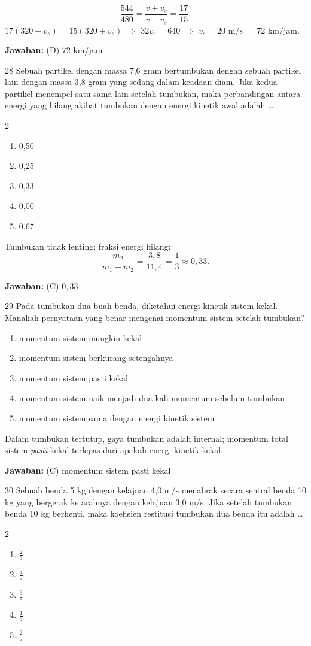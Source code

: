 \documentclass[11pt]{article}
\newenvironment{pil}{%
  \begin{enumerate}[label=(\Alph*),leftmargin=*,itemsep=1pt,topsep=3pt]}%
  {\end{enumerate}}
\newenvironment{pilB}{%
  \par\smallskip\begin{multicols}{2}
  \begin{enumerate}[label=(\Alph*),leftmargin=*,itemsep=1pt,topsep=3pt]}%
  {\end{enumerate}\end{multicols}}
\newcommand{\jawaban}[1]{%
  \noindent\colorbox{gold!30}{\parbox{\dimexpr\linewidth-2\fboxsep\relax}{%
    \textbf{Jawaban:} #1}}\par\smallskip}
\begin{document}
\begin{pembox}
\[\frac{544}{480}=\frac{v+v_s}{v-v_s}=\frac{17}{15}.\]
$17(320-v_s)=15(320+v_s)$ $\Rightarrow$ $32v_s=640$ $\Rightarrow$ $v_s=20$ m/s $=72$ km/jam.
\jawaban{(D) $72$ km/jam}
\end{pembox}

\begin{soal}{28}
Sebuah partikel dengan massa 7,6 gram bertumbukan dengan sebuah partikel
lain dengan massa 3,8 gram yang sedang dalam keadaan diam. Jika kedua
partikel menempel satu sama lain setelah tumbukan, maka perbandingan
antara energi yang hilang akibat tumbukan dengan energi kinetik awal
adalah \ldots
\begin{pilB}
  \item 0,50 \item 0,25 \item 0,33 \item 0,00 \item 0,67
\end{pilB}
\end{soal}

\begin{pembox}
Tumbukan tidak lenting; fraksi energi hilang:
\[\frac{m_2}{m_1+m_2}=\frac{3{,}8}{11{,}4}=\frac{1}{3}\approx0{,}33.\]
\jawaban{(C) $0{,}33$}
\end{pembox}

\begin{soal}{29}
Pada tumbukan dua buah benda, diketahui energi kinetik sistem kekal.
Manakah pernyataan yang benar mengenai momentum sistem setelah tumbukan?
\begin{pil}
  \item momentum sistem mungkin kekal
  \item momentum sistem berkurang setengahnya
  \item momentum sistem pasti kekal
  \item momentum sistem naik menjadi dua kali momentum sebelum tumbukan
  \item momentum sistem sama dengan energi kinetik sistem
\end{pil}
\end{soal}

\begin{pembox}
Dalam tumbukan tertutup, gaya tumbukan adalah internal; momentum total sistem \emph{pasti} kekal terlepas dari apakah energi kinetik kekal.
\jawaban{(C) momentum sistem pasti kekal}
\end{pembox}

\begin{soal}{30}
Sebuah benda 5 kg dengan kelajuan 4,0 m/s menabrak secara sentral benda
10 kg yang bergerak ke arahnya dengan kelajuan 3,0 m/s. Jika setelah
tumbukan benda 10 kg berhenti, maka koefisien restitusi tumbukan dua
benda itu adalah \ldots
\begin{pilB}
  \item $\tfrac{2}{3}$ \item $\tfrac{4}{7}$ \item $\tfrac{3}{7}$
  \item $\tfrac{1}{3}$ \item $\tfrac{2}{7}$
\end{pilB}
\end{soal}
\end{document}
